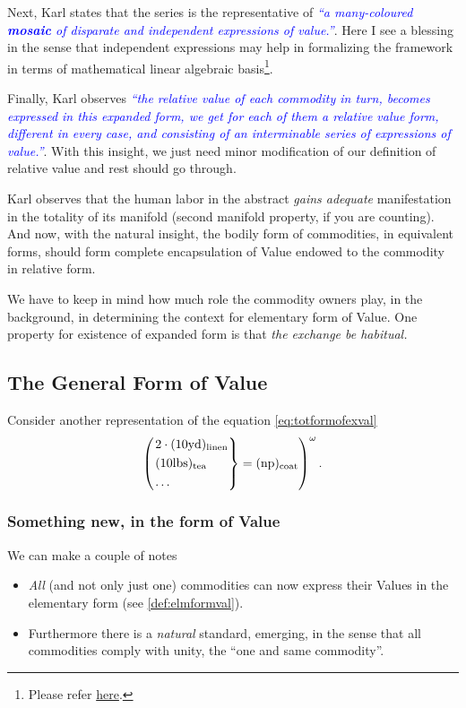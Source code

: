 \documentclass[12pt]{extarticle}
\theoremstyle{definition}
\begin{document}
Next, Karl states that the series is the representative of \emph{\textcolor{blue}{``a many-coloured \textbf{mosaic} of disparate and independent expressions of value.''}}.  Here I see a blessing in the sense that independent expressions may help in formalizing the framework in terms of mathematical linear algebraic basis\footnote{Please refer \href{https://en.wikipedia.org/wiki/Basis\_(linear\_algebra)}{here}.}.

Finally, Karl observes \emph{\textcolor{blue}{``the relative value of each commodity in turn, becomes expressed in this expanded form, we get for each of them a relative value form, different in every case, and consisting of an interminable series of expressions of value.''}}.  With this insight, we just need minor modification of our definition of relative value and rest should go through.

Karl observes that the human labor in the abstract \emph{gains adequate} manifestation in the totality of its manifold (second manifold property, if you are counting).  And now, with the natural insight, the bodily form of commodities, in equivalent forms, should form complete encapsulation of Value endowed to the commodity in relative form.

We have to keep in mind how much role the commodity owners play, in the background, in determining the context for elementary form of Value.  One property for existence of expanded form is that \emph{the exchange be habitual.}

\subsection{The General Form of Value}
Consider another representation of the equation \ref{eq:totformofexval}
\begin{equation}
  \label{eq:genformval}
 \left(
   \begin{rcases*} 
    2\cdot (10\text{yd})_{\text{linen}}\\
     (10\text{lbs})_{\text{tea}}\\
      \ldots
   \end{rcases*} = (\text{np})_{\text{coat}}\right)^\omega.
 \end{equation}
 \subsubsection{Something new, in the form of Value}
 \label{sec:newgenvalform}
 We can make a couple of notes
 \begin{itemize}
 \item \emph{All} (and not only just one) commodities can now express their Values in the elementary form (see \ref{def:elmformval}).  
   \item Furthermore there is a \emph{natural} standard, emerging, in the sense that all commodities comply with unity, the ``one and same commodity''.
 \end{itemize}
\end{document}
